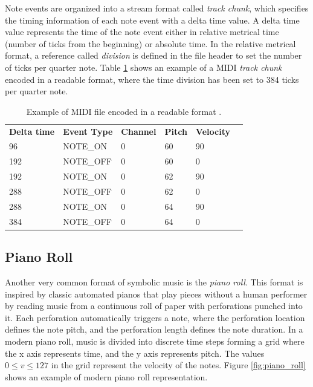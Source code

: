 Note events are organized into a stream format called \textit{track chunk}, which specifies the timing information of each note event with a delta time value. A delta time value represents the time of the note event either in relative metrical time (number of ticks from the beginning) or absolute time. In the relative metrical format, a reference called \textit{division} is defined in the file header to set the number of ticks per quarter note. Table \ref{tab:midi} shows an example of a MIDI \textit{track chunk} encoded in a readable format, where the time division has been set to 384 ticks per quarter note.

\begin{table}[h]
    \centering
    \begin{tabular}{llllll}
        \textbf{Delta time} & \textbf{Event Type} & \textbf{Channel} & \textbf{Pitch} & \textbf{Velocity} \\
        96  & NOTE\_ON  & 0 & 60 & 90 \\
        192 & NOTE\_OFF & 0 & 60 & 0  \\
        192 & NOTE\_ON  & 0 & 62 & 90 \\
        288 & NOTE\_OFF & 0 & 62 & 0  \\
        288 & NOTE\_ON  & 0 & 64 & 90 \\
        384 & NOTE\_OFF & 0 & 64 & 0
    \end{tabular}
    \caption{Example of MIDI file encoded in a readable format \cite{briot2017deep}.}
    \label{tab:midi}
\end{table}


\subsection{Piano Roll}
Another very common format of symbolic music is the \textit{piano roll}. This format is inspired by classic automated pianos that play pieces without a human performer by reading music from a continuous roll of paper with perforations punched into it. Each perforation automatically triggers a note, where the perforation location defines the note pitch, and the perforation length defines the note duration. In a modern piano roll, music is divided into discrete time steps forming a grid where the x axis represents time, and the y axis represents pitch. The values $0 \leq v \leq 127$ in the grid represent the velocity of the notes. Figure \ref{fig:piano_roll} shows an example of modern piano roll representation.

